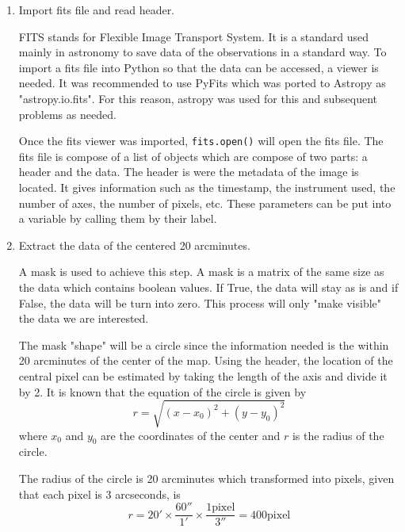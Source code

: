 \begin{enumerate}
    \item Import fits file and read header.
    
    FITS stands for Flexible Image Transport System. It is a standard used mainly in astronomy to save data of the observations in a standard way. To import a fits file into Python so that the data can be accessed, a viewer is needed. It was recommended to use PyFits which was ported to Astropy as "astropy.io.fits". For this reason, astropy was used for this and subsequent problems as needed. 
    
    Once the fits viewer was imported, 
    \lstinline[columns=fixed, style=Python]{fits.open()} 
    will open the fits file. The fits file is compose of a list of objects which are compose of two parts: a header and the data. The header is were the metadata of the image is located. It gives information such as the timestamp, the instrument used, the number of axes, the number of pixels, etc. These parameters can be put into a variable by calling them by their label. 
    
    \item Extract the data of the centered 20 arcminutes.
    
    A mask is used to achieve this step. A mask is a matrix of the same size as the data which contains boolean values. If True, the data will stay as is and if False, the data will be turn into zero. This process will only "make visible" the data we are interested. 
    
    The mask "shape" will be a circle since the information needed is the within 20 arcminutes of the center of the map. Using the header, the location of the central pixel can be estimated by taking the length of the axis and divide it by 2. It is known that the equation of the circle is given by 
    \begin{equation} \label{eq:circle}
        r = \sqrt{(x-x_0)^2 + (y-y_0)^2}
    \end{equation}
    where $x_0$ and $y_0$ are the coordinates of the center and $r$ is the radius of the circle. 
    
    The radius of the circle is 20 arcminutes which transformed into pixels, given that each pixel is 3 arcseconds, is 
    \begin{equation}\label{eq:radiusInPixels}
        r= 20' \times \frac{60''}{1'} \times \frac{1  \mathrm{pixel}}{3''} = 400 \mathrm{pixel}
    \end{equation}
    

\end{enumerate}
